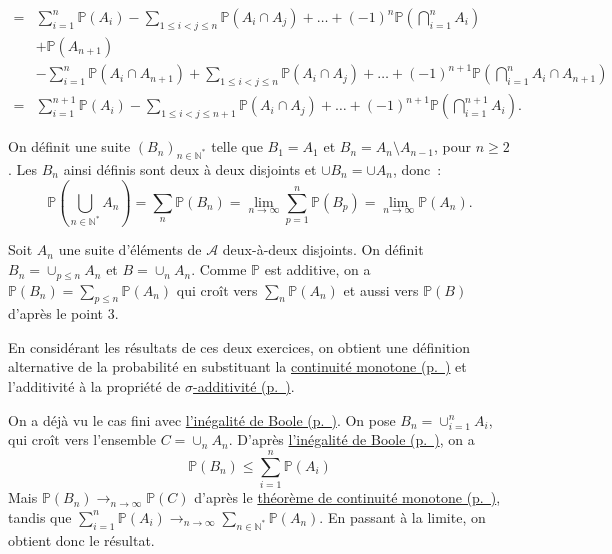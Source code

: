 \begin{enumerate}
\begin{align*}
                                  =& \sum_{i=1}^n \mathbb{P}(A_i) - \sum_{1 \leq i < j \leq n} \mathbb{P}(A_i \cap A_j) + \ldots + (-1)^n \mathbb{P}\left(\bigcap_{i=1}^n A_i\right) \\
                                   &+ \mathbb{P}(A_{n+1})\\
                                   &-\sum_{i=1}^n \mathbb{P}(A_i\cap A_{n+1}) + \sum_{1 \leq i < j \leq n} \mathbb{P}(A_i \cap A_j) + \ldots + (-1)^{n+1} \mathbb{P}\left(\bigcap_{i=1}^n A_i\cap A_{n+1}\right)\\
                                   =& \sum_{i=1}^{n+1} \mathbb{P}(A_i) - \sum_{1 \leq i < j \leq n +1 } \mathbb{P}(A_i \cap A_j) + \ldots + (-1)^{n+1} \mathbb{P}\left(\bigcap_{i=1}^{n+1} A_i\right).
  \end{align*}
\end{enumerate}

\label{I-answer-contmon}
On définit une suite \((B_n)_{n\in \mathbb{N}^\ast}\) telle que
\(B_1 = A_1\) et \(B_n = A_n \setminus A_{n-1}\), pour \(n\geq 2\). Les
\(B_n\) ainsi définis sont deux à deux disjoints et
\(\cup B_n = \cup A_n\), donc~:
\[ \mathbb{P}\left(\bigcup_{n\in\mathbb{N}^\ast} A_n\right) = \sum_n \mathbb{P}(B_n) = \lim_{n \to \infty} \sum_{p=1}^n \mathbb{P}(B_p) = \lim_{n \to \infty} \mathbb{P}(A_n).\]

\label{I-answer-altdef}
Soit \(A_n\) une suite d'éléments de \(\mathcal{A}\) deux-à-deux
disjoints. On définit \(B_n = \cup_{p \leq n} A_n\) et
\(B = \cup_n A_n\). Comme \(\mathbb{P}\) est additive, on a
\(\mathbb{P}(B_n) = \sum_{p \leq n} \mathbb{P}(A_n)\) qui croît vers
\(\sum_n \mathbb{P}(A_n)\) et aussi vers \(\mathbb{P}(B)\) d'après le
point 3.

En considérant les résultats de ces deux exercices, on obtient une
définition alternative de la probabilité en substituant la
\protect\hyperref[I-contmon]{continuité
monotone (p.~\pageref*{I-contmon})} et l'additivité à la propriété de
\protect\hyperref[I-defproba]{\(\sigma\)-additivité (p.~\pageref*{I-defproba})}.

\label{I-answer-boolinf}
On a déjà vu le cas fini avec \protect\hyperref[I-propelem]{l'inégalité
de Boole (p.~\pageref*{I-propelem})}. On pose
\(B_n = \cup_{i=1}^n A_i\), qui croît vers l'ensemble
\(C = \cup_n A_n\). D'après \protect\hyperref[I-propelem]{l'inégalité de
Boole (p.~\pageref*{I-propelem})}, on a
\[\mathbb{P}(B_n) \leq \sum_{i=1}^n \mathbb{P}(A_i)\] Mais
\(\mathbb{P}(B_n) \to_{n \to \infty} \mathbb{P}(C)\) d'après le
\protect\hyperref[I-contmon]{théorème de continuité
monotone (p.~\pageref*{I-contmon})}, tandis que
\(\sum_{i=1}^n \mathbb{P}(A_i) \to_{n \to \infty} \sum_{n\in\mathbb{N}^\ast} \mathbb{P}(A_n)\).
En passant à la limite, on obtient donc le résultat.

